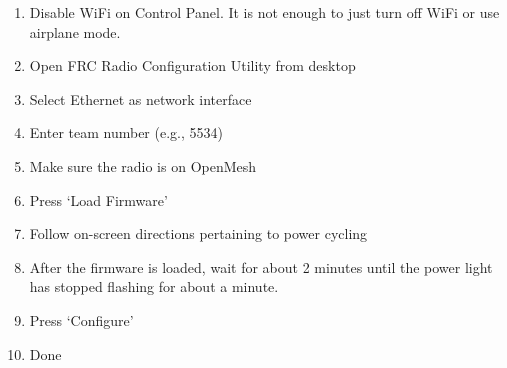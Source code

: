 \begin{enumerate}
\item Disable WiFi on Control Panel. It is not enough to just turn off WiFi or use airplane mode.

\item Open FRC Radio Configuration Utility from desktop

\item Select Ethernet as network interface

\item Enter team number (e.g., 5534)

\item Make sure the radio is on OpenMesh

\item Press `Load Firmware'

\item Follow on-screen directions pertaining to power cycling

\item After the firmware is loaded, wait for about 2 minutes until the power light has stopped flashing for about a minute.

\item Press `Configure'

\item Done
\end{enumerate}

